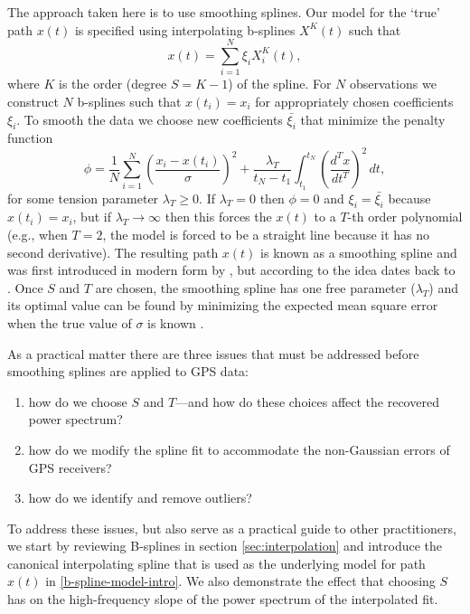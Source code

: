 \documentclass{ametsoc}
\begin{document}
The approach taken here is to use smoothing splines. Our model for the `true' path $x(t)$ is specified using interpolating b-splines $X^K(t)$ such that
\begin{equation}
\label{b-spline-model-intro}
    x(t) = \sum_{i=1}^N \xi_i X^K_i(t),
\end{equation}
where $K$ is the order (degree $S=K-1$) of the spline. For $N$ observations we construct $N$ b-splines such that $x(t_i)=x_i$ for appropriately chosen coefficients $\xi_i$. To smooth the data we choose new coefficients $\bar{\xi_i}$ that minimize the penalty function
\begin{equation}
\label{smoothing-spline}
\phi =  \frac{1}{N}\sum_{i=1}^{N} \left( \frac{x_i - x(t_i)}{\sigma} \right) ^2 + \frac{\lambda_T}{t_N-t_1} \int_{t_1}^{t_N} \left(\frac{d^T x}{dt^T}\right)^2 \, dt,
\end{equation}
for some tension parameter $\lambda_T \geq 0$. If $\lambda_T = 0$ then $\phi=0$ and $\xi_i=\bar{\xi_i}$ because $x(t_i)=x_i$, but if $\lambda_T \rightarrow \infty$ then this forces the $x(t)$ to a $T$-th order polynomial (e.g., when $T=2$, the model is forced to be a straight line because it has no second derivative). The resulting path $x(t)$ is known as a smoothing spline and was first introduced in modern form by \citet{reinsch1967-nm}, but according to \citet{deboor1978-book} the idea dates back to \citet{whittaker1923-pems}. Once $S$ and $T$ are chosen, the smoothing spline has one free parameter ($\lambda_T$) and its optimal value can be found by minimizing the expected mean square error when the true value of $\sigma$ is known \citep{craven1979-nm}.

As a practical matter there are three issues that must be addressed before smoothing splines are applied to GPS data:
\begin{enumerate}
    \item how do we choose $S$ and $T$---and how do these choices affect the recovered power spectrum?
    \item how do we modify the spline fit to accommodate the non-Gaussian errors of GPS receivers?
    \item how do we identify and remove outliers?
\end{enumerate}
To address these issues, but also serve as a practical guide to other practitioners, we start by reviewing B-splines in section \ref{sec:interpolation} and introduce the canonical interpolating spline that is used as the underlying model for path $x(t)$ in \eqref{b-spline-model-intro}. We also demonstrate the effect that choosing $S$ has on the high-frequency slope of the power spectrum of the interpolated fit.
\end{document}
